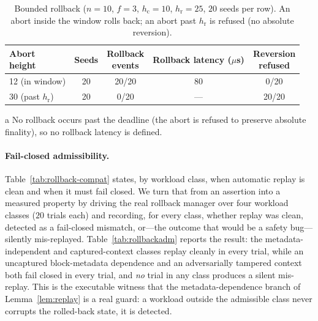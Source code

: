 \documentclass[journal]{IEEEtran}
\theoremstyle{definition}
\theoremstyle{remark}
\begin{document}
\begin{table}[t]
\centering
\begin{threeparttable}
\caption{Bounded rollback
($n{=}10$, $f{=}3$, $h_{\mathrm{c}}{=}10$, $h_{\mathrm{r}}{=}25$, $20$ seeds per row). An abort
inside the window rolls back; an abort past $h_{\mathrm{r}}$ is refused (no absolute reversion).}
\label{tab:rollback}
\setlength{\tabcolsep}{4pt}
\renewcommand{\arraystretch}{1.2}
\footnotesize
\begin{tabular}{lcccc}
\toprule
\makecell{Abort\\height} & Seeds & \makecell{Rollback\\events} & \makecell{Rollback\\latency ($\mu$s)} & \makecell{Reversion\\refused} \\
\midrule
12 (in window)            & 20 & 20/20 & 80           & 0/20  \\
30 (past $h_{\mathrm{r}}$) & 20 & 0/20  & ---\tnote{a} & 20/20 \\
\bottomrule
\end{tabular}
\begin{tablenotes}\footnotesize
\item[a] No rollback occurs past the deadline (the abort is refused to preserve absolute
finality), so no rollback latency is defined.
\end{tablenotes}
\end{threeparttable}
\end{table}

\paragraph{Fail-closed admissibility.}
Table~\ref{tab:rollback-compat} states, by workload class, when automatic replay is clean and when
it must fail closed. We turn that from an assertion into a measured property by driving the real
rollback manager over four workload classes ($20$ trials each) and recording, for every class,
whether replay was clean, detected as a fail-closed mismatch, or---the outcome that would be a
safety bug---silently mis-replayed. Table~\ref{tab:rollbackadm} reports the result: the
metadata-independent and captured-context classes replay cleanly in every trial, while an
uncaptured block-metadata dependence and an adversarially tampered context both fail closed in
every trial, and \emph{no} trial in any class produces a silent mis-replay. This is the executable
witness that the metadata-dependence branch of Lemma~\ref{lem:replay} is a real guard: a workload
outside the admissible class never corrupts the rolled-back state, it is detected.
\end{document}
